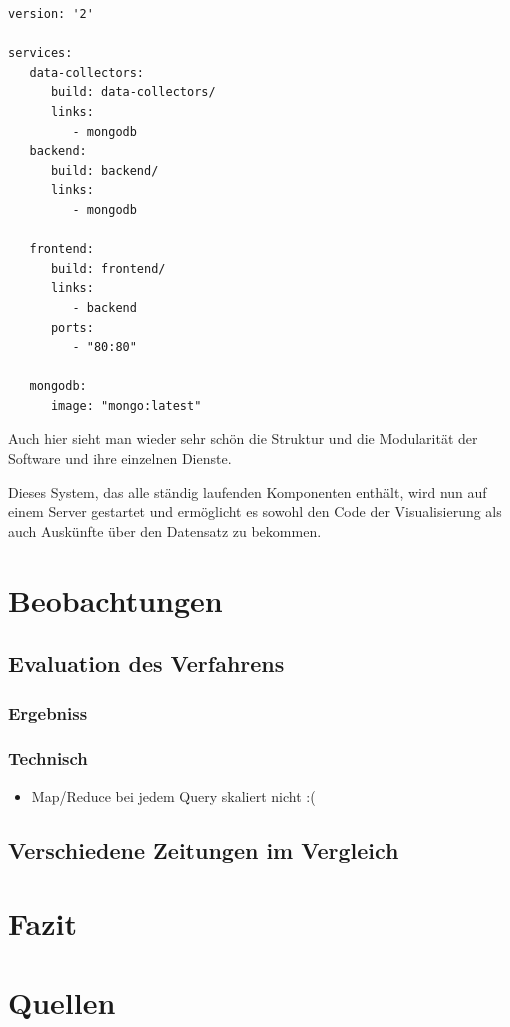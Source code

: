 \documentclass[12pt,ngerman,a4paperpaper,]{paper}
\providecommand{\tightlist}{%
  \setlength{\itemsep}{0pt}\setlength{\parskip}{0pt}}
\begin{document}
\begin{lstlisting}
version: '2'

services:
   data-collectors:
      build: data-collectors/
      links:
         - mongodb
   backend:
      build: backend/
      links:
         - mongodb

   frontend:
      build: frontend/
      links:
         - backend
      ports:
         - "80:80"

   mongodb:
      image: "mongo:latest"
\end{lstlisting}

Auch hier sieht man wieder sehr schön die Struktur und die Modularität
der Software und ihre einzelnen Dienste.

Dieses System, das alle ständig laufenden Komponenten enthält, wird nun
auf einem Server gestartet und ermöglicht es sowohl den Code der
Visualisierung als auch Auskünfte über den Datensatz zu bekommen.

\section{Beobachtungen}\label{beobachtungen}

\subsection{Evaluation des Verfahrens}\label{evaluation-des-verfahrens}

\subsubsection{Ergebniss}\label{ergebniss}

\subsubsection{Technisch}\label{technisch}

\begin{itemize}
\tightlist
\item
  Map/Reduce bei jedem Query skaliert nicht :(
\end{itemize}

\subsection{Verschiedene Zeitungen im
Vergleich}\label{verschiedene-zeitungen-im-vergleich}

\section{Fazit}\label{fazit}

\section{Quellen}\label{quellen}


\printbibliography
\end{document}

